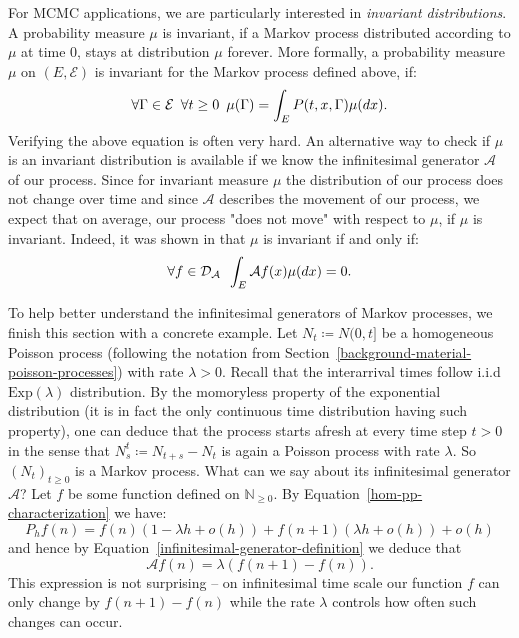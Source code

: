 \documentclass[report.tex]{subfiles}
\begin{document}
For MCMC applications, we are particularly interested in
\textit{invariant distributions}. A probability measure $\mu$ is invariant,
if a Markov process distributed according to $\mu$ at time $0$,
stays at distribution $\mu$ forever. More formally, a probability measure
$\mu$ on $(E, \mathcal{E})$ is invariant for the Markov process defined above, if:
$$\forall \Gamma \in \mathcal{E} \enskip \forall t \geq 0 \enskip \mu(\Gamma)
  = \int_{{E}}^{{}} {P(t, x, \Gamma)\mu(dx)}.$$
Verifying the above equation is often very hard.
An alternative way to check if $\mu$ is an invariant distribution is available
if we know the infinitesimal generator $\mathcal{A}$ of our process.
Since for invariant measure $\mu$ the distribution of our process does not change
over time and since $\mathcal{A}$ describes the movement of our process,
we expect that on average, our process "does not move" with respect to $\mu$,
if $\mu$ is invariant.
Indeed, it was shown in
\cite[Proposition 34.7] {davis1993markov} that $\mu$ is invariant if and only if:
\begin{equation}
  \label{infinitesimal-generator-invariance}
  \forall f \in \mathcal{D}_{\mathcal{A}} \enskip
  \int_{{E}}^{{}} {\mathcal{A}f(x)\mu(dx)} = 0.
\end{equation}

To help better understand the infinitesimal generators of Markov processes, we
finish this section with a concrete example.
Let $N_{t} \coloneqq N(0, t]$ be a homogeneous Poisson process (following the
notation from Section~\ref{background-material-poisson-processes})
with rate $\lambda > 0$. Recall that the interarrival times follow i.i.d
$\text{Exp}(\lambda)$ distribution. By the momoryless property of the exponential
distribution (it is in fact the only continuous time distribution having such
property), one can deduce that the process starts afresh at every time step
$t > 0$ in the sense that $N_{s}^{t} \coloneqq N_{t + s} - N_{t}$ is again a
Poisson process with rate $\lambda$. So $(N_{t})_{t \geq 0}$ is a Markov process.
What can we say about its infinitesimal generator $\mathcal{A}$? Let $f$ be some
function defined on $\mathbb{N}_{\geq 0}$.
By Equation~\ref{hom-pp-characterization}
we have:
$$P_{h}f(n) = f(n)(1 - \lambda h + o(h)) + f(n+1)(\lambda h + o(h)) + o(h)$$
and hence by Equation~\ref{infinitesimal-generator-definition} we deduce that
\begin{equation}
  \label{pp-infinitesimal-generator}
  \mathcal{A}f(n) = \lambda(f(n+1) - f(n)).
\end{equation}
This expression is not surprising -- on infinitesimal time scale our function $f$
can only change by $f(n+1) - f(n)$ while the rate $\lambda$ controls how often
such changes can occur.
\end{document}
